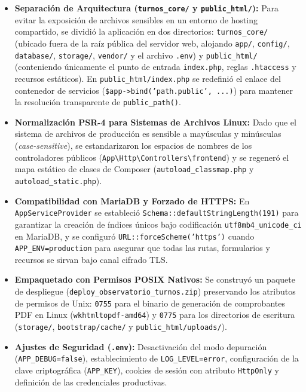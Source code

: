 \begin{itemize}
    \item \textbf{Separación de Arquitectura (\texttt{turnos\_core/} y \texttt{public\_html/}):} Para evitar la exposición de archivos sensibles en un entorno de hosting compartido, se dividió la aplicación en dos directorios: \texttt{turnos\_core/} (ubicado fuera de la raíz pública del servidor web, alojando \texttt{app/}, \texttt{config/}, \texttt{database/}, \texttt{storage/}, \texttt{vendor/} y el archivo \texttt{.env}) y \texttt{public\_html/} (conteniendo únicamente el punto de entrada \texttt{index.php}, reglas \texttt{.htaccess} y recursos estáticos). En \texttt{public\_html/index.php} se redefinió el enlace del contenedor de servicios (\texttt{\$app->bind('path.public', ...)}) para mantener la resolución transparente de \texttt{public\_path()}.
    \item \textbf{Normalización PSR-4 para Sistemas de Archivos Linux:} Dado que el sistema de archivos de producción es sensible a mayúsculas y minúsculas (\textit{case-sensitive}), se estandarizaron los espacios de nombres de los controladores públicos (\texttt{App\textbackslash Http\textbackslash Controllers\textbackslash frontend}) y se regeneró el mapa estático de clases de Composer (\texttt{autoload\_classmap.php} y \texttt{autoload\_static.php}).
    \item \textbf{Compatibilidad con MariaDB y Forzado de HTTPS:} En \texttt{AppServiceProvider} se estableció \texttt{Schema::defaultStringLength(191)} para garantizar la creación de índices únicos bajo codificación \texttt{utf8mb4\_unicode\_ci} en MariaDB, y se configuró \texttt{URL::forceScheme('https')} cuando \texttt{APP\_ENV=production} para asegurar que todas las rutas, formularios y recursos se sirvan bajo canal cifrado TLS.
    \item \textbf{Empaquetado con Permisos POSIX Nativos:} Se construyó un paquete de despliegue (\texttt{deploy\_observatorio\_turnos.zip}) preservando los atributos de permisos de Unix: \texttt{0755} para el binario de generación de comprobantes PDF en Linux (\texttt{wkhtmltopdf-amd64}) y \texttt{0775} para los directorios de escritura (\texttt{storage/}, \texttt{bootstrap/cache/} y \texttt{public\_html/uploads/}).
    \item \textbf{Ajustes de Seguridad (\texttt{.env}):} Desactivación del modo depuración (\texttt{APP\_\allowbreak DEBUG=\allowbreak false}), establecimiento de \texttt{LOG\_LEVEL=error}, configuración de la clave criptográfica (\texttt{APP\_KEY}), cookies de sesión con atributo \texttt{HttpOnly} y definición de las credenciales productivas.
\end{itemize}

